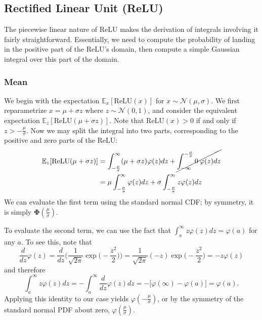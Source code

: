 \documentclass{article}
\theoremstyle{plain}
\theoremstyle{definition}
\theoremstyle{remark}
\newcommand{\Pphi}{\boldsymbol{\Phi}}
\newcommand{\E}{\mathbb{E}}
\begin{document}
\subsection{Rectified Linear Unit (ReLU)}\label{app:relu}

The piecewise linear nature of ReLU makes the derivation of integrals involving it fairly straightforward. Essentially, we need to compute the probability of landing in the positive part of the ReLU's domain, then compute a simple Gaussian integral over this part of the domain.

\subsubsection{Mean}

We begin with the expectation $\E_x [\mathrm{ReLU}(x)]$ for $x \sim \mathcal{N}(\mu, \sigma)$. We first reparametrize $x = \mu + \sigma z$ where $z \sim \mathcal{N}(0, 1)$, and consider the equivalent expectation $\E_z [\mathrm{ReLU}(\mu + \sigma z)]$. Note that $\mathrm{ReLU}(x) > 0$ if and only if $z > -\frac{\mu}{\sigma}$. Now we may split the integral into two parts, corresponding to the positive and zero parts of the ReLU:
\begin{align*}
    \E_z [\mathrm{ReLU}(\mu + \sigma z)] &= \int_{-\frac{\mu}{\sigma}}^{\infty} (\mu + \sigma z) \varphi(z) dz + \cancel{\int_{-\infty}^{-\frac{\mu}{\sigma}} 0\: \varphi(z) dz} \\
    &= \mu \int_{-\frac{\mu}{\sigma}}^{\infty} \varphi(z) dz + \sigma  \int_{-\frac{\mu}{\sigma}}^{\infty} z \varphi(z) dz
\end{align*}
We can evaluate the first term using the standard normal CDF; by symmetry, it is simply $\Pphi ( \frac{\mu}{\sigma})$.

To evaluate the second term, we can use the fact that $\int_a^{\infty} z \varphi(z) dz = \varphi(a)$ for any $a$. To see this, note that
\begin{equation}
\frac{d}{dz} \varphi(z) = \frac{d}{dz} \Big ( \frac{1}{\sqrt{2 \pi}} \exp \big ( -\frac{z^2}{2} \big ) \Big ) = \frac{1}{\sqrt{2 \pi}} (-z) \exp \Big ( -\frac{z^2}{2} \Big ) = -z \varphi(z)
\end{equation}
and therefore
\begin{equation}\label{eq:linear-expectation}
    \int_a^{\infty} z \varphi(z) dz = -\int_a^{\infty} \frac{d}{dz} \varphi(z) dz = -\big [ \varphi(\infty) - \varphi(a) \big ] = \varphi(a).
\end{equation}
Applying this identity to our case yields $\varphi(-\frac{\mu}{\sigma})$, or by the symmetry of the standard normal PDF about zero, $\varphi(\frac{\mu}{\sigma})$.
\end{document}
